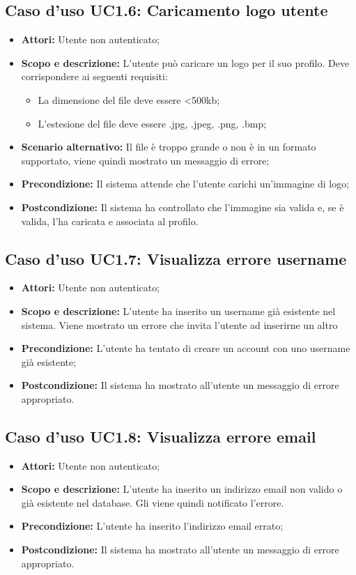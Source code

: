 \documentclass[12pt,a4paper,titlepage]{article}
\begin{document}
	\subsection{Caso d'uso UC1.6: Caricamento logo utente}
	\label{UC1.6}
	\begin{itemize}
		\item \textbf{Attori: }Utente non autenticato;
		\item \textbf{Scopo e descrizione: }L'utente può caricare un logo per il suo profilo. Deve corrispondere ai seguenti requisiti:
		\begin{itemize}
			\item La dimensione del file deve essere <500kb;
			\item L'estesione del file deve essere .jpg, .jpeg, .png, .bmp;
		\end{itemize}
		\item \textbf{Scenario alternativo: }Il file è troppo grande o non è in un formato supportato, viene quindi mostrato un messaggio di errore;
		\item \textbf{Precondizione: }Il sistema attende che l'utente carichi un'immagine di logo;
		\item \textbf{Postcondizione: }Il sistema ha controllato che l'immagine sia valida e, se è valida, l'ha caricata e associata al profilo.
	\end{itemize}
	\subsection{Caso d'uso UC1.7: Visualizza errore username}
	\label{UC1.7}
	\begin{itemize}
		\item \textbf{Attori: }Utente non autenticato;
		\item \textbf{Scopo e descrizione: }L'utente ha inserito un username già esistente nel sistema. Viene mostrato un errore che invita l'utente ad inserirne un altro
		\item \textbf{Precondizione: }L'utente ha tentato di creare un account con uno username già esistente;
		\item \textbf{Postcondizione: }Il sistema ha mostrato all'utente un messaggio di errore appropriato.
	\end{itemize}
	\subsection{Caso d'uso UC1.8: Visualizza errore email}
	\label{UC1.8}
	\begin{itemize}
		\item \textbf{Attori: }Utente non autenticato;
		\item \textbf{Scopo e descrizione: }L'utente ha inserito un indirizzo email non valido o già esistente nel database. Gli viene quindi notificato l'errore.
		\item \textbf{Precondizione: }L'utente ha inserito l'indirizzo email errato;
		\item \textbf{Postcondizione: }Il sistema ha mostrato all'utente un messaggio di errore appropriato.
	\end{itemize}
\end{document}
